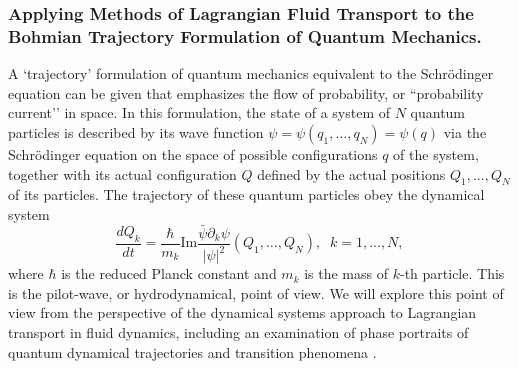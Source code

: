 \documentclass[11pt]{NSFamsart}
\begin{document}

\subsubsection*{Applying Methods of Lagrangian Fluid Transport to the Bohmian Trajectory Formulation of Quantum Mechanics.}   A `trajectory'  formulation of quantum mechanics  equivalent to the Schr\"{o}dinger equation can be given \cite{Bohmian, Holland1993TheQT} that emphasizes the flow of probability, or ``probability current’’ in space. 
In this formulation, the state of a system of $N$ quantum particles is described by its wave function $\psi=\psi(q_1,…,q_N)=\psi(q)$ via the Schr\"{o}dinger equation  on the space of possible configurations $q$ of the system, together with its actual configuration $Q$ defined by the actual positions $Q_1,...,Q_N$ of its particles. The trajectory of these quantum particles obey the dynamical system
$$
\frac{dQ_k}{dt}= \frac{\hbar}{m_k} \text{Im} \frac{\bar\psi  \partial_k \psi}{|\psi|^2}(Q_1,…,Q_N),\;\; k=1, ..., N,  $$
where $\hbar$ is the reduced Planck constant and $m_k$ is the mass of $k$-th particle.
This is the pilot-wave, or hydrodynamical, point of view. We will explore this point of view from the perspective of the dynamical systems approach to Lagrangian transport in fluid dynamics, including an examination of phase portraits of quantum dynamical trajectories \cite{Berndl1995OnTG} and transition phenomena \cite{waalkens2007wigner,Micha2006QuantumDW, Dittrich2016}. 



  
\end{document}
